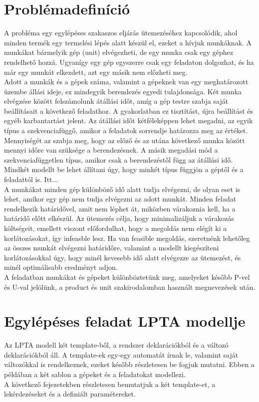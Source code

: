 \documentclass {report}
\begin{document}
\chapter{Problémadefiníció}
A probléma egy egylépéses szakaszos eljárás ütemezéséhez kapcsolódik, ahol minden termék egy termelési lépés alatt készül el, ezeket a hívjuk munkáknak. A munkákat bármelyik gép (unit) elvégezheti, de egy munka csak egy géphez rendelhető hozzá. Ugyanígy egy gép egyszerre csak egy feladaton dolgozhat, és ha már egy munkát elkezdett, azt egy másik nem előzheti meg. \\
Adott a munkák és a gépek száma, valamint a gépeknek van egy meghatározott üzembe állási ideje, ez mindegyik berendezés egyedi tulajdonsága. Két munka elvégzése között felszámolunk átállási időt, amíg a gép testre szabja saját beállításait a következő feladathoz. A gyakorlatban ez tisztítást, újra beállítást és egyéb karbantartást jelent. Az átállási időt kétféleképpen lehet megadni, az egyik típus a szekvenciafüggő, amikor a feladatok sorrendje határozza meg az értéket. Mennyiségét az szabja meg, hogy az előző és az utána következő munka között mennyi időre van szüksége a berendezésnek. A másik megadási mód a szekvenciafüggetlen típus, amikor csak a berendezéstől függ az átállási idő. Mindkét modellt be lehet állítani úgy, hogy minkét típus függjön a géptől és a feladattól is. Itt... \\
A munkákat minden gép különböző idő alatt tudja elvégezni, de olyan eset is lehet, amikor egy gép nem tudja elvégezni az adott munkát. Minden feladat rendelkezik határidővel, amit nem léphet át, miközben várakoznia kell, ha a határidő előtt elkészül. Az ütemezés célja, hogy minimalizáljuk a várakozás költségeit, emellett viszont előfordulhat, hogy a megoldás nem elégít ki a korlátozásokat, így infeasble lesz. Ha van feasible megoldás, szeretnénk lehetőleg az összes munkát elvégezni határidőre, valamint a modellt kiegészíteni korlátozásokkal úgy, hogy minél kevesebb idő alatt elvégezze az ütemezést, és minél optimálisabb eredményt adjon.  \\
A feladatban munkákat és gépeket különböztetünk meg, amelyeket később P-vel és U-val jelölünk, a product és unit szakirodalomban használt megnevezések után.

  

\chapter{Egylépéses feladat LPTA modellje}
    Az LPTA modell két template-ből, a rendszer deklarációkból és a változó deklarációkból áll. A template-ek egy-egy automatát írnak le, valamint saját változókkal is rendelkeznek, ezeket később részletesen be fogjuk mutatni. Ebben a példában a két sablon a gépeket és a feladatokat modellezi.\\
    A következő fejezetekben részletesen bemutatjuk a két template-et, a lekérdezéseket és a definiált paramétereket.
\end{document}
